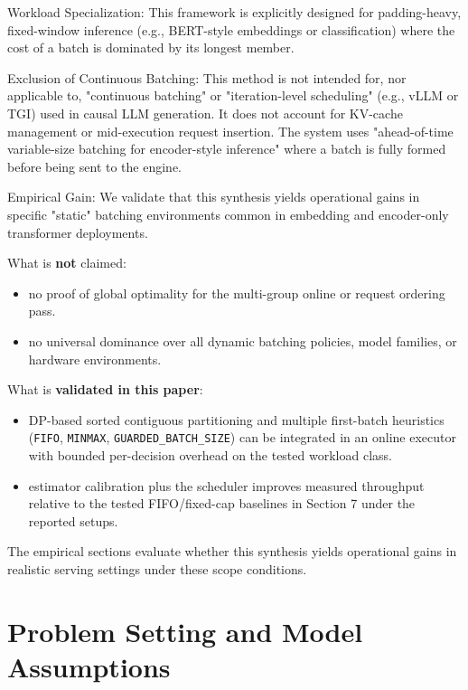 \documentclass{article}
\providecommand{\tightlist}{\setlength{\itemsep}{0pt}\setlength{\parskip}{0pt}}
\begin{document}
Workload Specialization: This framework is explicitly designed for
padding-heavy, fixed-window inference (e.g., BERT-style embeddings or
classification) where the cost of a batch is dominated by its longest
member.

Exclusion of Continuous Batching: This method is not intended for, nor
applicable to, "continuous batching" or "iteration-level scheduling"
(e.g., vLLM or TGI) used in causal LLM generation. It does not account
for KV-cache management or mid-execution request insertion. The system
uses "ahead-of-time variable-size batching for encoder-style inference"
where a batch is fully formed before being sent to the engine.

Empirical Gain: We validate that this synthesis yields operational gains
in specific "static" batching environments common in embedding and
encoder-only transformer deployments.

What is \textbf{not} claimed:

\begin{itemize}
\tightlist
\item
  no proof of global optimality for the multi-group online or request
  ordering pass.
\item
  no universal dominance over all dynamic batching policies, model
  families, or hardware environments.
\end{itemize}

What is \textbf{validated in this paper}:

\begin{itemize}
\tightlist
\item
  DP-based sorted contiguous partitioning and multiple first-batch
  heuristics (\texttt{FIFO}, \texttt{MINMAX},
  \texttt{GUARDED\_BATCH\_SIZE}) can be integrated in an online executor
  with bounded per-decision overhead on the tested workload class.
\item
  estimator calibration plus the scheduler improves measured throughput
  relative to the tested FIFO/fixed-cap baselines in Section 7 under the
  reported setups.
\end{itemize}

The empirical sections evaluate whether this synthesis yields
operational gains in realistic serving settings under these scope
conditions.

\hypertarget{3-problem-setting-and-model-assumptions}{%
\section{Problem Setting and Model
Assumptions}\label{3-problem-setting-and-model-assumptions}}
\end{document}

